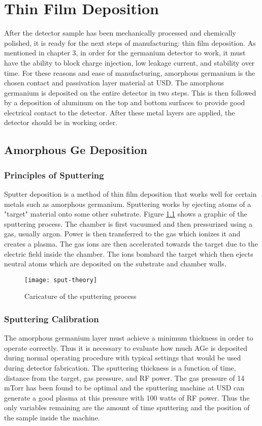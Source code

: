 
\chapter{Thin Film Deposition}
After the detector sample has been mechanically processed and chemically polished, it is ready for the next steps of manufacturing: thin film deposition.
As mentioned in chapter 3, in order for the germanium detector to work, it must have the ability to block charge injection, low leakage current, and stability over time.
For these reasons and ease of manufacturing, amorphous germanium is the chosen contact and passivation layer material at USD.
The amorphous germanium is deposited on the entire detector in two steps.
This is then followed by a deposition of aluminum on the top and bottom surfaces to provide good electrical contact to the detector.
After these metal layers are applied, the detector should be in working order.

\section{Amorphous Ge Deposition}

\subsection{Principles of Sputtering}
Sputter deposition is a method of thin film deposition that works well for certain metals such as amorphous germanium.
Sputtering works by ejecting atoms of a "target" material onto some other substrate.
Figure \ref{fig:sput-theory} shows a graphic of the sputtering process.
The chamber is first vacuumed and then pressurized using a gas, usually argon.
Power is then transferred to the gas which ionizes it and creates a plasma.
The gas ions are then accelerated towards the target due to the electric field inside the chamber.
The ions bombard the target which then ejects neutral atoms which are deposited on the substrate and chamber walls.

\begin{figure}[htpb]
\centering
\texttt{[image: sput-theory]}
\caption{Caricature of the sputtering process}
\label{fig:sput-theory}
\end{figure}

\subsection{Sputtering Calibration}
The amorphous germanium layer must achieve a minimum thickness in order to operate correctly.
Thus it is necessary to evaluate how much AGe is deposited during normal operating procedure with typical settings that would be used during detector fabrication.
The sputtering thickness is a function of time, distance from the target, gas pressure, and RF power.
The gas pressure of 14 mTorr has been found to be optimal and the sputtering machine at USD can generate a good plasma at this pressure with 100 watts of RF power.
Thus the only variables remaining are the amount of time sputtering and the position of the sample inside the machine.

